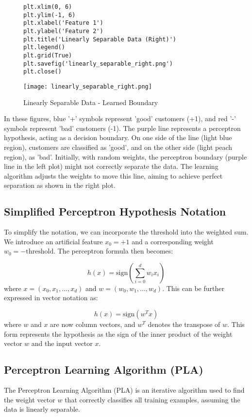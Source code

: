 \documentclass{article}
\begin{document}
\begin{figure}[H]
\begin{minipage}{0.45\textwidth}
\begin{verbatim}
plt.xlim(0, 6)
plt.ylim(-1, 6)
plt.xlabel('Feature 1')
plt.ylabel('Feature 2')
plt.title('Linearly Separable Data (Right)')
plt.legend()
plt.grid(True)
plt.savefig('linearly_separable_right.png')
plt.close()
        \end{verbatim}
        \texttt{[image: linearly\_separable\_right.png]}
        \caption{Linearly Separable Data - Learned Boundary}
        \label{fig:linearly_separable_right}
    \end{minipage}
\end{figure}

In these figures, blue '+' symbols represent 'good' customers (+1), and red '-' symbols represent 'bad' customers (-1). The purple line represents a perceptron hypothesis, acting as a decision boundary. On one side of the line (light blue region), customers are classified as 'good', and on the other side (light peach region), as 'bad'. Initially, with random weights, the perceptron boundary (purple line in the left plot) might not correctly separate the data. The learning algorithm adjusts the weights to move this line, aiming to achieve perfect separation as shown in the right plot.

\subsection{Simplified Perceptron Hypothesis Notation}
To simplify the notation, we can incorporate the threshold into the weighted sum.  We introduce an artificial feature $x_0 = +1$ and a corresponding weight $w_0 = -\text{threshold}$.  The perceptron formula then becomes:

\[
h(x) = \text{sign}\left( \sum_{i=0}^{d} w_i x_i \right)
\]
where $x = (x_0, x_1, ..., x_d)$ and $w = (w_0, w_1, ..., w_d)$.  This can be further expressed in vector notation as:

\[
h(x) = \text{sign}(w^T x)
\]
where $w$ and $x$ are now column vectors, and $w^T$ denotes the transpose of $w$. This form represents the hypothesis as the sign of the inner product of the weight vector $w$ and the input vector $x$.

\subsection{Perceptron Learning Algorithm (PLA)}
The Perceptron Learning Algorithm (PLA) is an iterative algorithm used to find the weight vector $w$ that correctly classifies all training examples, assuming the data is linearly separable.
\end{document}
